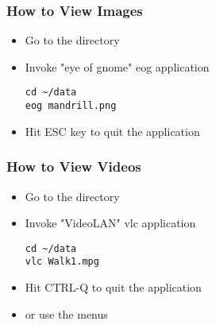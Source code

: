 \begin{frame}[fragile]
\frametitle{How to View Images}
\begin{itemize}
\item Go to the directory
\item Invoke "eye of gnome" eog application
\begin{verbatim}
cd ~/data
eog mandrill.png
\end{verbatim}
\pause
\item Hit ESC key to quit the application
\end{itemize}
\end{frame}

\begin{frame}[fragile]
\frametitle{How to View Videos}
\begin{itemize}
\item Go to the directory
\item Invoke "VideoLAN" vlc application
\begin{verbatim}
cd ~/data
vlc Walk1.mpg
\end{verbatim}
\pause
\item Hit CTRL-Q to quit the application
\item or use the menus
\end{itemize}
\end{frame}
